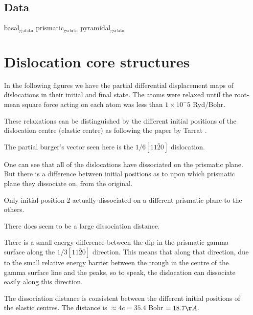 \documentclass[11pt]{article}
\begin{document}
\subsection{Data}
\label{sec:org9491dc0}
\href{file:///home/tigany/Documents/ti/final\_model\_2019-11-12/results\_2019-11-09\_muc/gamma\_surfaces/basal/basal\_gs\_noo\_alat\_energies.dat}{basal\(_{\text{gs}}\)\(_{\text{data}}\)}
\href{file:///home/tigany/Documents/ti/final\_model\_2019-11-12/results\_2019-11-09\_muc/gamma\_surfaces/prismatic/prismatic\_gs\_noo\_alat\_energies.dat}{prismatic\(_{\text{gs}}\)\(_{\text{data}}\)}
\href{file:///home/tigany/Documents/ti/final\_model\_2019-11-12/gamma\_surfaces/pyramidal\_results\_2019-11-13/pyramidal\_gamma\_surface\_2019-11-13.dat}{pyramidal\(_{\text{gs}}\)\(_{\text{data}}\)}
\section{Dislocation core structures}
\label{sec:org9246a69}
In the following figures we have the partial differential
displacement maps of dislocations in their initial and final
state. The atoms were relaxed until the root-mean square force
acting on each atom was less than \(1\times 10^-5\) Ryd/Bohr. 

These relaxations can be distinguished by the different initial
positions of the dislocation centre (elastic centre) as following
the paper by Tarrat \cite{Tarrat2009}.

The partial burger's vector seen here is the \(1/6 [11\bar{2}0]\)
dislocation.

One can see that all of the dislocations have dissociated on the
prismatic plane. But there is a difference between initial
positions as to upon which prismatic plane they dissociate on,
from the original. 

Only initial position 2 actually dissociated on a different
prismatic plane to the others. 


There does seem to be a large dissociation distance. 

There is a small energy difference between the dip in the
prismatic gamma surface along the \(1/3 [11\bar{2}0]\)
direction. This means that along that direction, due to the small
relative energy barrier between the trough in the centre of the
gamma surface line and the peaks, so to speak, the dislocation
can dissociate easily along this direction. 

The dissociation distance is consistent between the different
initial positions of the elastic centres. The distance is \(\approx4c =
    35.4\) Bohr \(= 18.7 \AA\).
\end{document}
